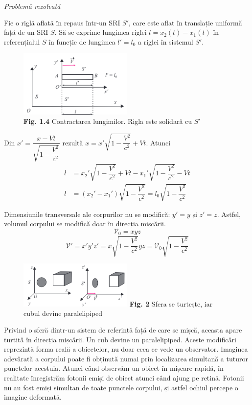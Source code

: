 \documentclass[a4paper, 12pt]{article}
\newcommand{\figcaption}[2]{\textbf{Fig. #1} #2}
\newcommand{\lorentzradical}{\sqrt{1 - \dfrac{V^2}{c^2}}}
\begin{document}
\pagebreak

{\Large\emph{Problemă rezolvată}}
\vspace{0.5cm}

\par
Fie o riglă aflată în repaus într-un SRI $S'$, care este aflat în translație
uniformă față de un SRI $S$. Să se exprime lungimea riglei \( l = x_2(t) - x_1(t) \)
în referențialul $S$ în funcție de lungimea \( l' = l_0 \)
a riglei în sistemul $S'$.

\begin{figure}[h]
    \centering
    \includegraphics[width=0.5\textwidth]{fig/rigla} \\
    \figcaption{1.4}{Contractarea lungimilor. Rigla este solidară cu $S'$}
\end{figure}

\par
Din \( x' = \dfrac{x - Vt}{\lorentzradical} \)
rezultă \( x = x' \lorentzradical + Vt \). Atunci
\begin{align*}
    l &= x_2' \lorentzradical + Vt - x_1' \lorentzradical - Vt \\
    l &= (x_2' - x_1') \lorentzradical = l_0 \lorentzradical
\end{align*}

\vspace{1cm}

\par
Dimensiunile transversale ale corpurilor nu se modifică: \( y' = y \) și \( z' = z \).
Astfel, volumul corpului se modifică doar în direcția mișcării.
\[ \mathscr{V}_0 = xyz \]
\[ \mathscr{V}' = x'y'z' = x\lorentzradical yz = \mathscr{V}_0 \lorentzradical \]

\begin{figure}
    \includegraphics[width=0.5\textwidth]{fig/turtit.png}
    \figcaption{2}{Sfera se turtește, iar cubul devine paralelipiped}
\end{figure}

Privind o sferă dintr-un sistem de referință față de care se mișcă, aceasta
apare turtită în direcția mișcării. Un cub devine un paralelipiped.
Aceste modificări reprezintă forma reală a obiectelor, nu doar ceea ce vede
un observator. Imaginea adevărată a corpului poate fi obținută numai prin
localizarea simultană a tuturor punctelor acestuia. Atunci când observăm un
obiect în mișcare rapidă, în realitate înregistrăm fotonii emiși de obiect
atunci când ajung pe retină. Fotonii nu au fost emiși simultan de toate punctele
corpului, și astfel ochiul percepe o imagine deformată.
\end{document}
